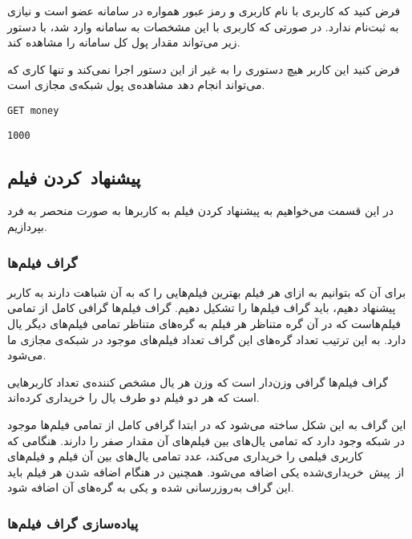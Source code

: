 \documentclass{utap}
\begin{document}
    فرض کنید که کاربری با نام کاربری  و رمز عبور  همواره در سامانه عضو است و نیازی به ثبت‌نام ندارد. در صورتی که کاربری با این مشخصات به سامانه وارد شد، با دستور زیر می‌تواند مقدار پول کل سامانه را مشاهده کند.

    فرض کنید این کاربر هیچ دستوری را به غیر از این دستور اجرا نمی‌کند و تنها کاری که می‌تواند انجام دهد مشاهده‌ی پول شبکه‌ی مجازی است.

    \begin{latin}
        \begin{Verbatim}[frame=lines,label={\rl{دستور ورودی}}]
GET money
        \end{Verbatim}
        \begin{Verbatim}[frame=lines,label={\rl{خروجی}}]
1000
        \end{Verbatim}
    \end{latin}

    \subsection{پیشنهاد~کردن فیلم}

    در این قسمت می‌خواهیم به پیشنهاد کردن فیلم به کاربر‌ها به صورت منحصر به فرد بپردازیم.

    \subsubsection{گراف فیلم‌ها}

    برای آن ‌که بتوانیم به ازای هر فیلم بهترین فیلم‌هایی را که به آن شباهت دارند به کاربر پیشنهاد دهیم، باید گراف فیلم‌ها را تشکیل دهیم. گراف فیلم‌ها گرافی کامل از تمامی فیلم‌هاست که در آن گره متناظر هر فیلم به گره‌های متناظر تمامی فیلم‌های دیگر یال دارد. به این ترتیب تعداد گره‌های این گراف تعداد فیلم‌های موجود در شبکه‌ی مجازی ما می‌شود.

    گراف فیلم‌‌ها گرافی وزن‌دار است که وزن هر یال مشخص کننده‌ی تعداد کاربر‌هایی است که هر دو فیلم دو طرف یال را خریداری  کرده‌اند.

    این گراف به این شکل ساخته می‌شود که در ابتدا گرافی کامل از تمامی فیلم‌ها موجود در شبکه وجود دارد که تمامی یال‌های بین فیلم‌های آن مقدار صفر را دارند. هنگامی که کاربری فیلمی را خریداری می‌کند، عدد تمامی یال‌های بین آن فیلم و فیلم‌های از~پیش~خریداری‌شده یکی اضافه می‌شود. همچنین در هنگام اضافه شدن هر فیلم باید این گراف به‌روز‌رسانی شده و یکی به گره‌های آن اضافه شود.

    \subsubsection{پیاده‌سازی گراف فیلم‌ها}
\end{document}
